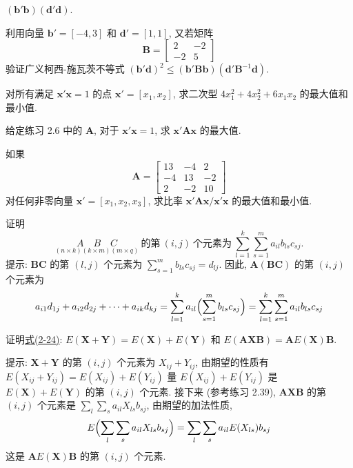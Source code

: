 \noindent $(\mathbf{b}'\mathbf{b})(\mathbf{d}'\mathbf{d})$.

\medskip
{}\quad 利用向量 $\mathbf{b}'=[-4,3]$ 和 $\mathbf{d}'=[1,1]$, 又若矩阵
\[
\mathbf{B}=\begin{bmatrix}2&-2\\-2&5\end{bmatrix}
\]
验证广义柯西-施瓦茨不等式 $(\mathbf{b}'\mathbf{d})^{2}\le(\mathbf{b}'\mathbf{B}\mathbf{b})(\mathbf{d}'\mathbf{B}^{-1}\mathbf{d})$.

\medskip
{}\quad 对所有满足 $\mathbf{x}'\mathbf{x}=1$ 的点 $\mathbf{x}'=[x_{1},x_{2}]$, 求二次型 $4x_{1}^{2}+4x_{2}^{2}+6x_{1}x_{2}$ 的最大值和最小值.

\medskip
{}\quad 给定练习 2.6 中的 $\mathbf{A}$, 对于 $\mathbf{x}'\mathbf{x}=1$, 求 $\mathbf{x}'\mathbf{A}\mathbf{x}$ 的最大值.

\medskip
{}\quad 如果
\[
\mathbf{A}=\begin{bmatrix}13&-4&2\\-4&13&-2\\2&-2&10\end{bmatrix}
\]
对任何非零向量 $\mathbf{x}'=[x_{1},x_{2},x_{3}]$, 求比率 $\mathbf{x}'\mathbf{A}\mathbf{x}/\mathbf{x}'\mathbf{x}$ 的最大值和最小值.

\medskip
{}\quad 证明
\[
\underset{(n\times k)(k\times m)(m\times q)}{A\quad B\quad C}\ \text{的第}\ (i,j)\ \text{个元素为}\ \sum_{l=1}^{k}\sum_{s=1}^{m}a_{il}b_{ls}c_{sj}.
\]
提示: $\mathbf{B}\mathbf{C}$ 的第 $(l,j)$ 个元素为 $\sum_{s=1}^{m}b_{ls}c_{sj}=d_{lj}$. 因此, $\mathbf{A}(\mathbf{B}\mathbf{C})$ 的第 $(i,j)$ 个元素为
\[
a_{i1}d_{1j}+a_{i2}d_{2j}+\cdots+a_{ik}d_{kj}=\sum_{l=1}^{k}a_{il}\Bigl(\sum_{s=1}^{m}b_{ls}c_{sj}\Bigr)=\sum_{l=1}^{k}\sum_{s=1}^{m}a_{il}b_{ls}c_{sj}
\]

\medskip
{}\quad 证明\hyperref[eq:2-24]{式(2-24)}: $E(\mathbf{X}+\mathbf{Y})=E(\mathbf{X})+E(\mathbf{Y})$ 和 $E(\mathbf{A}\mathbf{X}\mathbf{B})=\mathbf{A}E(\mathbf{X})\mathbf{B}$.

\noindent 提示: $\mathbf{X}+\mathbf{Y}$ 的第 $(i,j)$ 个元素为 $X_{ij}+Y_{ij}$, 由期望的性质有 $E(X_{ij}+Y_{ij})=E(X_{ij})+E(Y_{ij})$ 量 $E(X_{ij})+E(Y_{ij})$ 是 $E(\mathbf{X})+E(\mathbf{Y})$ 的第 $(i,j)$ 个元素. 接下来 (参考练习 2.39), $\mathbf{A}\mathbf{X}\mathbf{B}$ 的第 $(i,j)$ 个元素是 $\sum_{l}\sum_{s}a_{il}X_{ls}b_{sj}$, 由期望的加法性质,
\[
E\Bigl(\sum_{l}\sum_{s}a_{il}X_{ls}b_{sj}\Bigr)=\sum_{l}\sum_{s}a_{il}E(X_{ls})b_{sj}
\]
这是 $\mathbf{A}E(\mathbf{X})\mathbf{B}$ 的第 $(i,j)$ 个元素.

